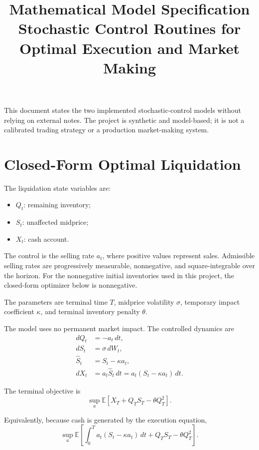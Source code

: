 \documentclass[11pt]{article}
\title{Mathematical Model Specification\\
\large Stochastic Control Routines for Optimal Execution and Market Making}
\author{}
\date{}
\begin{document}
\maketitle

This document states the two implemented stochastic-control models without relying on external notes. The project is synthetic and model-based; it is not a calibrated trading strategy or a production market-making system.

\section{Closed-Form Optimal Liquidation}

The liquidation state variables are:
\begin{itemize}[itemsep=2pt]
    \item $Q_t$: remaining inventory;
    \item $S_t$: unaffected midprice;
    \item $X_t$: cash account.
\end{itemize}

The control is the selling rate $a_t$, where positive values represent sales. Admissible selling rates are progressively measurable, nonnegative, and square-integrable over the horizon. For the nonnegative initial inventories used in this project, the closed-form optimizer below is nonnegative.

The parameters are terminal time $T$, midprice volatility $\sigma$, temporary impact coefficient $\kappa$, and terminal inventory penalty $\theta$.

The model uses no permanent market impact. The controlled dynamics are
\begin{align}
dQ_t &= -a_t\,dt, \\
dS_t &= \sigma\,dW_t, \\
\widehat{S}_t &= S_t-\kappa a_t, \\
dX_t &= a_t\widehat{S}_t\,dt
     = a_t(S_t-\kappa a_t)\,dt.
\end{align}

The terminal objective is
\begin{equation}
\sup_a \mathbb{E}\left[X_T + Q_T S_T - \theta Q_T^2\right].
\end{equation}

Equivalently, because cash is generated by the execution equation,
\begin{equation}
\sup_a \mathbb{E}\left[
\int_0^T a_t(S_t-\kappa a_t)\,dt
+ Q_T S_T - \theta Q_T^2
\right].
\end{equation}
\end{document}
